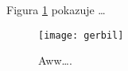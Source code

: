 \documentclass{article}
\begin{document}
Figura \ref{fig:gerbil} pokazuje \ldots

\begin{figure}
\centering
\texttt{[image: gerbil]}
\caption{\label{fig:gerbil}Aww\ldots.}
\end{figure}
\end{document}
